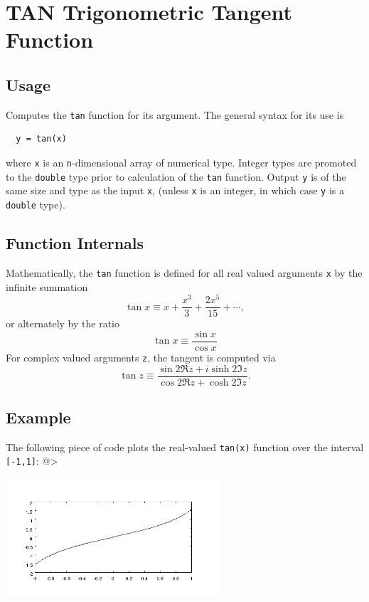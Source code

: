 \section{TAN Trigonometric Tangent Function}

\subsection{Usage}

Computes the \verb|tan| function for its argument.  The general
syntax for its use is
\begin{verbatim}
  y = tan(x)
\end{verbatim}
where \verb|x| is an \verb|n|-dimensional array of numerical type.
Integer types are promoted to the \verb|double| type prior to
calculation of the \verb|tan| function.  Output \verb|y| is of the
same size and type as the input \verb|x|, (unless \verb|x| is an
integer, in which case \verb|y| is a \verb|double| type).  
\subsection{Function Internals}

Mathematically, the \verb|tan| function is defined for all real
valued arguments \verb|x| by the infinite summation
\[
  \tan x \equiv x + \frac{x^3}{3} + \frac{2x^5}{15} + \cdots,
\]
or alternately by the ratio
\[
  \tan x \equiv \frac{\sin x}{\cos x}
\]
For complex valued arguments \verb|z|, the tangent is computed via
\[
  \tan z \equiv \frac{\sin 2 \Re z + i \sinh 2 \Im z}
                     {\cos 2 \Re z + \cosh 2 \Im z}.
\]
\subsection{Example}

The following piece of code plots the real-valued \verb|tan(x)|
function over the interval \verb|[-1,1]|:
@>


\centerline{\includegraphics[width=8cm]{tanplot}}

